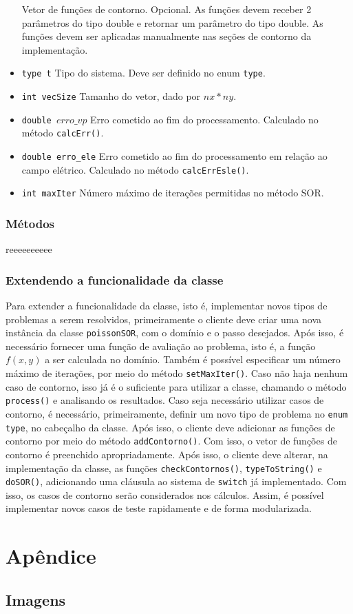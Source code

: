 \documentclass[oneside]{abntex2}
\begin{document}
\begin{itemize}
        Vetor de funções de contorno. Opcional. As funções devem receber 2 parâmetros do tipo double e retornar um parâmetro do tipo double. As funções devem ser aplicadas manualmente nas seções de contorno da implementação.
    \item \texttt{type t} \newline
        Tipo do sistema. Deve ser definido no enum \texttt{type}.
    \item \texttt{int vecSize} \newline
        Tamanho do vetor, dado por $nx * ny$.
    \item \texttt{double $erro\_{vp}$} \newline
        Erro cometido ao fim do processamento. Calculado no método \texttt{calcErr()}.
    \item \texttt{double erro\_ele} \newline
        Erro cometido ao fim do processamento em relação ao campo elétrico. Calculado no método \texttt{calcErrEsle()}.
    \item \texttt{int maxIter} \newline
        Número máximo de iterações permitidas no método SOR.
\end{itemize}
\subsection{Métodos}
reeeeeeeeee
\subsection{Extendendo a funcionalidade da classe}
Para extender a funcionalidade da classe, isto é, implementar novos tipos de problemas a serem resolvidos, primeiramente o cliente deve criar uma nova instância da classe \texttt{poissonSOR}, com o domínio e o passo desejados. Após isso, é necessário fornecer uma função de avaliação ao problema, isto é, a função $f(x, y)$ a ser calculada no domínio. Também é possível especificar um número máximo de iterações, por meio do método \texttt{setMaxIter()}. Caso não haja nenhum caso de contorno, isso já é o suficiente para utilizar a classe, chamando o método \texttt{process()} e analisando os resultados.
Caso seja necessário utilizar casos de contorno, é necessário, primeiramente, definir um novo tipo de problema no \texttt{enum type}, no cabeçalho da classe. Após isso, o cliente deve adicionar as funções de contorno por meio do método \texttt{addContorno()}. Com isso, o vetor de funções de contorno é preenchido apropriadamente. Após isso, o cliente deve alterar, na implementação da classe, as funções \texttt{checkContornos()}, \texttt{typeToString()} e \texttt{doSOR()}, adicionando uma cláusula ao sistema de \texttt{switch} já implementado. Com isso, os casos de contorno serão considerados nos cálculos. 
Assim, é possível implementar novos casos de teste rapidamente e de forma modularizada.
\chapter{Apêndice}
\section{Imagens}
\end{document}
